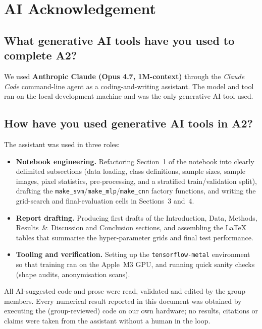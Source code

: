 \documentclass[../main.tex]{subfiles}
\begin{document}
\section*{AI Acknowledgement}

\subsection*{What generative AI tools have you used to complete A2?}
\noindent
We used \textbf{Anthropic Claude (Opus 4.7, 1M-context)} through the
\emph{Claude Code} command-line agent as a coding-and-writing assistant.
The model and tool ran on the local development machine and was the only
generative AI tool used.

\subsection*{How have you used generative AI tools in A2?}
\noindent
The assistant was used in three roles:
\begin{itemize}
    \item \textbf{Notebook engineering.} Refactoring Section~1 of the
    notebook into clearly delimited subsections (data loading, class
    definitions, sample sizes, sample images, pixel statistics,
    pre-processing, and a stratified train/validation split), drafting the
    \texttt{make\_svm}/\texttt{make\_mlp}/\texttt{make\_cnn} factory
    functions, and writing the grid-search and final-evaluation cells in
    Sections~3 and~4.
    \item \textbf{Report drafting.} Producing first drafts of the
    Introduction, Data, Methods, Results~\&~Discussion and Conclusion
    sections, and assembling the LaTeX tables that summarise the
    hyper-parameter grids and final test performance.
    \item \textbf{Tooling and verification.} Setting up the
    \texttt{tensorflow-metal} environment so that training ran on the
    Apple~M3 GPU, and running quick sanity checks (shape audits,
    anonymisation scans).
\end{itemize}

\noindent
All AI-suggested code and prose were read, validated and edited by the
group members. Every numerical result reported in this document was
obtained by executing the (group-reviewed) code on our own hardware; no
results, citations or claims were taken from the assistant without a
human in the loop.
\end{document}
